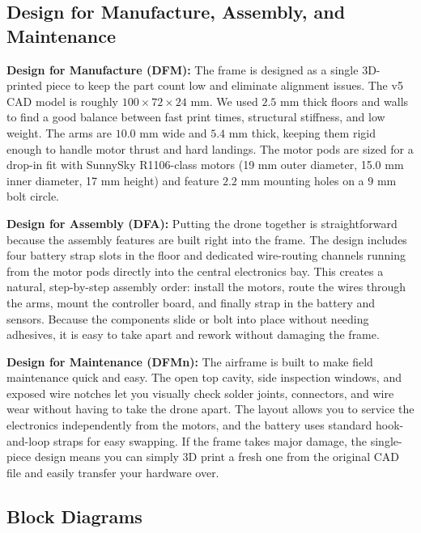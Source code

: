\documentclass[journal, onecolumn]{IEEEtran}
\begin{document}
\subsection{Design for Manufacture, Assembly, and Maintenance}

\textbf{Design for Manufacture (DFM):}
The frame is designed as a single 3D-printed piece to keep the part count low and eliminate alignment issues. The v5 CAD model is roughly $100 \times 72 \times 24$ mm. We used $2.5$ mm thick floors and walls to find a good balance between fast print times, structural stiffness, and low weight. The arms are $10.0$ mm wide and $5.4$ mm thick, keeping them rigid enough to handle motor thrust and hard landings. The motor pods are sized for a drop-in fit with SunnySky R1106-class motors (19 mm outer diameter, 15.0 mm inner diameter, 17 mm height) and feature $2.2$ mm mounting holes on a $9$ mm bolt circle.

\vspace{0.5em}

\textbf{Design for Assembly (DFA):}
Putting the drone together is straightforward because the assembly features are built right into the frame. The design includes four battery strap slots in the floor and dedicated wire-routing channels running from the motor pods directly into the central electronics bay. This creates a natural, step-by-step assembly order: install the motors, route the wires through the arms, mount the controller board, and finally strap in the battery and sensors. Because the components slide or bolt into place without needing adhesives, it is easy to take apart and rework without damaging the frame.

\vspace{0.5em}

\textbf{Design for Maintenance (DFMn):}
The airframe is built to make field maintenance quick and easy. The open top cavity, side inspection windows, and exposed wire notches let you visually check solder joints, connectors, and wire wear without having to take the drone apart. The layout allows you to service the electronics independently from the motors, and the battery uses standard hook-and-loop straps for easy swapping. If the frame takes major damage, the single-piece design means you can simply 3D print a fresh one from the original CAD file and easily transfer your hardware over.

\subsection{Block Diagrams}
\end{document}
